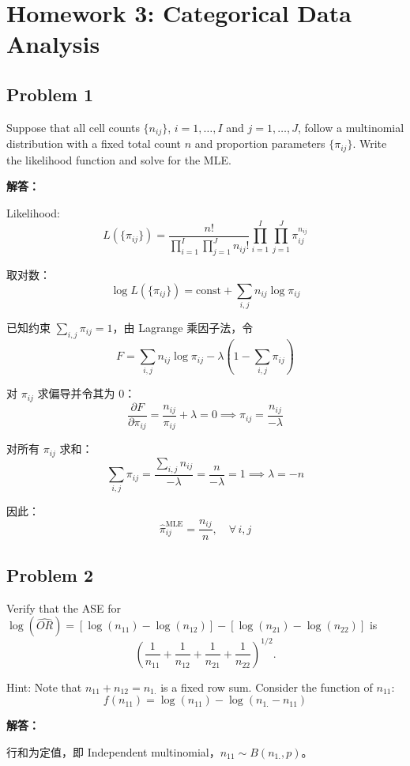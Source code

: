 \section{Homework 3: Categorical Data Analysis}

\subsection{Problem 1}

Suppose that all cell counts $\{n_{ij}\}$, $i = 1, \ldots, I$ and $j = 1, \ldots, J$, follow a multinomial distribution with a fixed total count $n$ and proportion parameters $\{\pi_{ij}\}$. Write the likelihood function and solve for the MLE.

\textbf{解答：}

Likelihood:
\[
L(\{\pi_{ij}\}) = \frac{n!}{\prod_{i=1}^{I} \prod_{j=1}^{J} n_{ij}!} \prod_{i=1}^{I} \prod_{j=1}^{J} \pi_{ij}^{n_{ij}}
\]

取对数：
\[
\log L(\{\pi_{ij}\}) = \text{const} + \sum_{i,j} n_{ij} \log \pi_{ij}
\]

已知约束 $\sum_{i,j} \pi_{ij} = 1$，由 Lagrange 乘因子法，令
\[
F = \sum_{i,j} n_{ij} \log \pi_{ij} - \lambda \left(1 - \sum_{i,j} \pi_{ij}\right)
\]

对 $\pi_{ij}$ 求偏导并令其为 0：
\[
\frac{\partial F}{\partial \pi_{ij}} = \frac{n_{ij}}{\pi_{ij}} + \lambda = 0 \implies \pi_{ij} = \frac{n_{ij}}{-\lambda}
\]

对所有 $\pi_{ij}$ 求和：
\[
\sum_{i,j} \pi_{ij} = \frac{\sum_{i,j} n_{ij}}{-\lambda} = \frac{n}{-\lambda} = 1 \implies \lambda = -n
\]

因此：
\[
\boxed{\hat{\pi}_{ij}^{\text{MLE}} = \frac{n_{ij}}{n}, \quad \forall\, i, j}
\]

\subsection{Problem 2}

Verify that the ASE for $\log(\widehat{OR}) = [\log(n_{11}) - \log(n_{12})] - [\log(n_{21}) - \log(n_{22})]$ is
\[
\left(\frac{1}{n_{11}} + \frac{1}{n_{12}} + \frac{1}{n_{21}} + \frac{1}{n_{22}}\right)^{1/2}.
\]

Hint: Note that $n_{11} + n_{12} = n_{1.}$ is a fixed row sum. Consider the function of $n_{11}$:
\[
f(n_{11}) = \log(n_{11}) - \log(n_{1.} - n_{11})
\]

\textbf{解答：}

行和为定值，即 Independent multinomial，$n_{11} \sim B(n_{1.}, p)$。


